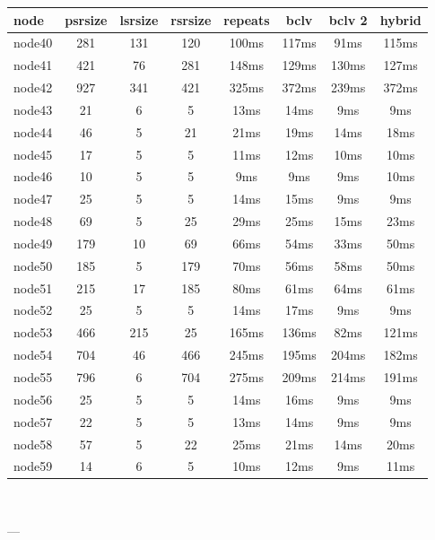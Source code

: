 \begin{tabular}{|l|c|c|c|c|c|c|c|}
\hline node & psrsize & lsrsize & rsrsize   & repeats & bclv & bclv 2 & hybrid\\
    \hline node40 & 281 & 131 & 120 & 100ms & 117ms & 91ms & 115ms\\
    \hline node41 & 421 & 76 & 281 & 148ms & 129ms & 130ms & 127ms\\
    \hline node42 & 927 & 341 & 421 & 325ms & 372ms & 239ms & 372ms\\
    \hline node43 & 21 & 6 & 5 & 13ms & 14ms & 9ms & 9ms\\
    \hline node44 & 46 & 5 & 21 & 21ms & 19ms & 14ms & 18ms\\
    \hline node45 & 17 & 5 & 5 & 11ms & 12ms & 10ms & 10ms\\
    \hline node46 & 10 & 5 & 5 & 9ms & 9ms & 9ms & 10ms\\
    \hline node47 & 25 & 5 & 5 & 14ms & 15ms & 9ms & 9ms\\
    \hline node48 & 69 & 5 & 25 & 29ms & 25ms & 15ms & 23ms\\
    \hline node49 & 179 & 10 & 69 & 66ms & 54ms & 33ms & 50ms\\
    \hline node50 & 185 & 5 & 179 & 70ms & 56ms & 58ms & 50ms\\
    \hline node51 & 215 & 17 & 185 & 80ms & 61ms & 64ms & 61ms\\
    \hline node52 & 25 & 5 & 5 & 14ms & 17ms & 9ms & 9ms\\
    \hline node53 & 466 & 215 & 25 & 165ms & 136ms & 82ms & 121ms\\
    \hline node54 & 704 & 46 & 466 & 245ms & 195ms & 204ms & 182ms\\
    \hline node55 & 796 & 6 & 704 & 275ms & 209ms & 214ms & 191ms\\
    \hline node56 & 25 & 5 & 5 & 14ms & 16ms & 9ms & 9ms\\
    \hline node57 & 22 & 5 & 5 & 13ms & 14ms & 9ms & 9ms\\
    \hline node58 & 57 & 5 & 22 & 25ms & 21ms & 14ms & 20ms\\
    \hline node59 & 14 & 6 & 5 & 10ms & 12ms & 9ms & 11ms\\

\hline
\end{tabular} \

---


